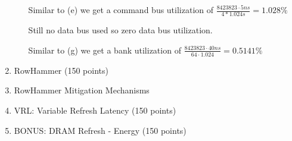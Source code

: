 \documentclass[a4paper]{article}
\begin{document}
\begin{enumerate}
\begin{enumerate}
                Similar to (e) we get a command bus utilization of $\frac{8423823\cdot5ns}{4*1.024s}=1.028\%$

                Still no data bus used so zero data bus utilization.

                Similar to (g) we get a bank utilization of $\frac{8423823\cdot40ns}{64\cdot1.024}=
                0.5141\%$
        \end{enumerate}
    \item RowHammer (150 points)
    \item RowHammer Mitigation Mechanisms
    \item VRL: Variable Refresh Latency (150 points)
    \item BONUS: DRAM Refresh - Energy (150 points)
\end{enumerate}
\end{document}
